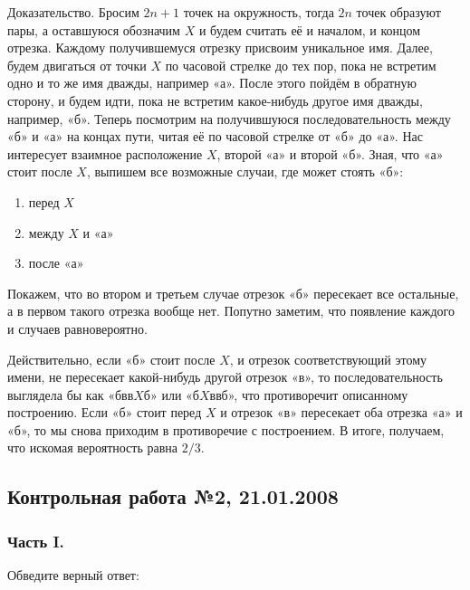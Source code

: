\begin{enumerate}
\begin{enumerate}
Доказательство. Бросим $2n+1$ точек на окружность, тогда $2n$ точек образуют пары, а оставшуюся обозначим $X$ и будем считать её и началом, и концом отрезка.
Каждому получившемуся отрезку присвоим уникальное имя.
Далее, будем двигаться от точки $X$ по часовой стрелке до тех пор, пока не встретим одно и то же имя дважды, например «а».
После этого пойдём в обратную сторону, и будем идти, пока не встретим какое-нибудь другое имя дважды, например, «б».
Теперь посмотрим на получившуюся последовательность между «б» и «а» на концах пути, читая её по часовой стрелке от «б» до «а».
Нас интересует взаимное расположение $X$, второй «а» и второй «б».
Зная, что «а» стоит после $X$, выпишем все возможные случаи, где может стоять «б»:
\begin{enumerate}
\item перед $X$
\item между $X$ и «а»
\item после «а»
\end{enumerate}
Покажем, что во втором и третьем случае отрезок «б» пересекает все остальные, а в первом такого отрезка вообще нет. Попутно заметим, что появление каждого и случаев равновероятно.

Действительно, если «б» стоит после $X$, и отрезок соответствующий этому имени, не пересекает какой-нибудь другой отрезок «в», то последовательность выглядела бы как «бвв$X$б» или «б$X$ввб», что противоречит описанному построению.
Если «б» стоит перед $X$ и отрезок «в» пересекает оба отрезка «а» и «б», то мы снова приходим в противоречие с построением.
В итоге, получаем, что искомая вероятность равна $2/3$.
\end{enumerate}
\end{enumerate}




\subsection{Контрольная работа №2, 21.01.2008}

\subsubsection*{Часть I.}

Обведите верный ответ:

